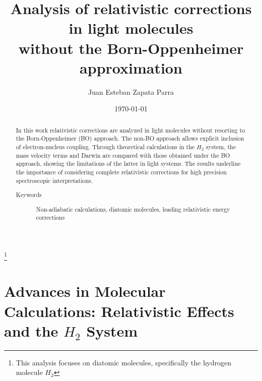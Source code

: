 \documentclass[%
 reprint,
 amsmath,amssymb,
 aps,
]{revtex4-2}
\begin{document}

\title{Analysis of relativistic corrections in light molecules\\ without the Born-Oppenheimer approximation}%
\thanks{This analysis focuses on diatomic molecules, specifically the hydrogen molecule $H_2$}%

\author{Juan Esteban Zapata Parra}
%
\date{\today}%

\begin{abstract}
In this work relativistic corrections are analyzed in light molecules without resorting to the Born-Oppenheimer (BO) approach. The non-BO approach allows explicit inclusion of electron-nucleus coupling. Through theoretical calculations in the $H_2$ system, the mass velocity terms and Darwin are compared with those obtained under the BO approach, showing the limitations of the latter in light systems. The results underline the importance of considering complete relativistic corrections for high precision spectroscopic interpretations.
\begin{description}
\item[Keywords]
Non-adiabatic calculations, diatomic molecules, leading relativistic energy corrections
\end{description}
\end{abstract}

\maketitle


\section{\label{sec:level1}Advances in Molecular Calculations: Relativistic Effects and the $H_2$ System}

\end{document}
